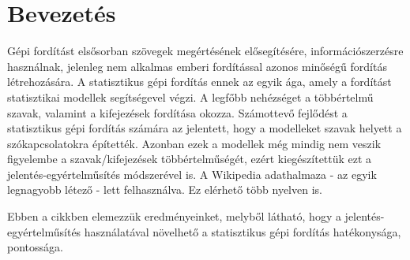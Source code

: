 \section{Bevezetés}
Gépi fordítást elsősorban szövegek megértésének elősegítésére, információszerzésre használnak, jelenleg nem alkalmas emberi fordítással azonos minőségű fordítás létrehozására. A statisztikus gépi fordítás ennek az egyik ága, amely a fordítást statisztikai modellek segítségevel végzi.
A legfőbb nehézséget a többértelmű szavak, valamint a kifejezések fordítása okozza.
Számottevő fejlődést a statisztikus gépi fordítás számára az jelentett, hogy a modelleket szavak helyett a szókapcsolatokra építették. Azonban ezek a modellek még mindig nem veszik figyelembe a szavak/kifejezések többértelműségét, ezért kiegészítettük ezt a jelentés-egyértelműsítés módszerével is. A Wikipedia adathalmaza - az egyik legnagyobb létező - lett felhasználva. Ez elérhető több nyelven is. 

Ebben a cikkben elemezzük eredményeinket, melyből látható, hogy a jelentés-egyértelműsítés használatával növelhető a statisztikus gépi fordítás hatékonysága, pontossága.